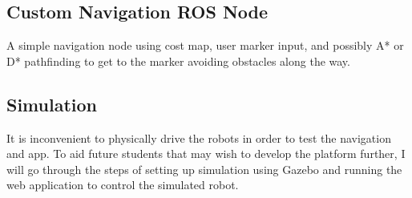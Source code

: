 \documentclass{article}
\begin{document}
\subsection{Custom Navigation ROS Node}
A simple navigation node using cost map, user marker input, and possibly A* or D* pathfinding to get to the marker avoiding obstacles along the way.

\subsection{Simulation}

It is inconvenient to physically drive the robots in order to test the navigation and app. To aid future students that may wish to develop the
platform further, I will go through the steps of setting up simulation using Gazebo and running the web application to control the simulated robot.
\end{document}

